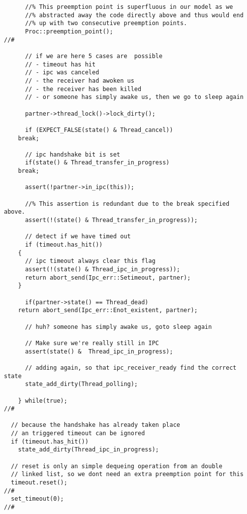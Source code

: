 \begin{lstlisting}
      //% This preemption point is superfluous in our model as we 
      //% abstracted away the code directly above and thus would end
      //% up with two consecutive preemption points.
      Proc::preemption_point();                                            //#

      // if we are here 5 cases are  possible
      // - timeout has hit
      // - ipc was canceled
      // - the receiver had awoken us
      // - the receiver has been killed
      // - or someone has simply awake us, then we go to sleep again

      partner->thread_lock()->lock_dirty();
      
      if (EXPECT_FALSE(state() & Thread_cancel))
	break;

      // ipc handshake bit is set
      if(state() & Thread_transfer_in_progress)
	break;

      assert(!partner->in_ipc(this));

      //% This assertion is redundant due to the break specified above.
      assert(!(state() & Thread_transfer_in_progress));

      // detect if we have timed out
      if (timeout.has_hit())
	{
	  // ipc timeout always clear this flag
	  assert(!(state() & Thread_ipc_in_progress));
	  return abort_send(Ipc_err::Setimeout, partner);
	}

      if(partner->state() == Thread_dead)
	return abort_send(Ipc_err::Enot_existent, partner);

      // huh? someone has simply awake us, goto sleep again

      // Make sure we're really still in IPC
      assert(state() &  Thread_ipc_in_progress);                           

      // adding again, so that ipc_receiver_ready find the correct state
      state_add_dirty(Thread_polling);                                     

    } while(true);                                                         //#
  
  // because the handshake has already taken place
  // an triggered timeout can be ignored
  if (timeout.has_hit())
    state_add_dirty(Thread_ipc_in_progress);
 
  // reset is only an simple dequeing operation from an double
  // linked list, so we dont need an extra preemption point for this
  timeout.reset();                                                         //#
  set_timeout(0);                                                          //#
  

\end{lstlisting}
